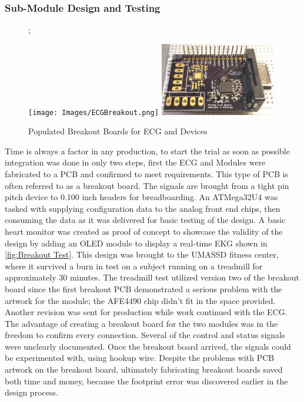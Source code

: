 \subsubsection {Sub-Module Design and Testing}

\begin{figure};
	\begin{center}
		\label{fig:Breakouts}
		\texttt{[image: Images/ECGBreakout.png]} 
		\includegraphics[scale=1,width=0.45\textwidth]{Images/SPO2Breakout.png} 		
		\caption{Populated Breakout Boards for ECG and  Devices}
	\end{center}
\end{figure}

Time is always a factor in any production, to start the trial as soon as possible integration was done in only two steps, first the ECG and  Modules were fabricated to a PCB and confirmed to meet requirements. This type of PCB is often referred to as a breakout board. The signals are brought from a tight pin pitch device to 0.100 inch headers for breadboarding. An ATMega32U4 \cite{ATMEGA32U4} was tasked with supplying configuration data to the analog front end chips, then consuming the data as it was delivered for basic testing of the design. A basic heart monitor was created as proof of concept to showcase the validity of the design by adding an OLED module to display a real-time EKG shown in \cref{fig:Breakout Test}. This design was brought to the UMASSD fitness center, where it survived a burn in test on a subject running on a treadmill for approximately 30 minutes. 
The treadmill test utilized version two of the breakout board since the first breakout PCB demonstrated a serious problem with the artwork for the  module; the AFE4490 chip didn't fit in the space provided. Another revision was sent for production while work continued with the ECG. The advantage of creating a breakout board for the two modules was in the freedom to confirm every connection. Several of the control and status signals were unclearly documented. Once the breakout board arrived, the signals could be experimented with, using hookup wire. Despite the problems with PCB artwork on the breakout board, ultimately fabricating breakout boards saved both time and money, because the footprint error was discovered earlier in the design process.


